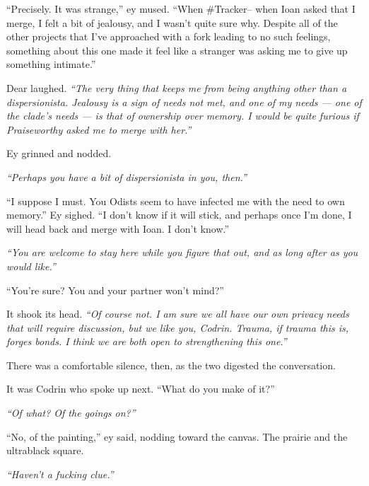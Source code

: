 ``Precisely. It was strange,'' ey mused. ``When \#Tracker-- when Ioan asked that I merge, I felt a bit of jealousy, and I wasn't quite sure why. Despite all of the other projects that I've approached with a fork leading to no such feelings, something about this one made it feel like a stranger was asking me to give up something intimate.''

Dear laughed. \emph{``The very thing that keeps me from being anything other than a dispersionista. Jealousy is a sign of needs not met, and one of my needs — one of the clade's needs — is that of ownership over memory. I would be quite furious if Praiseworthy asked me to merge with her.''}

Ey grinned and nodded.

\emph{``Perhaps you have a bit of dispersionista in you, then.''}

``I suppose I must. You Odists seem to have infected me with the need to own memory.'' Ey sighed. ``I don't know if it will stick, and perhaps once I'm done, I will head back and merge with Ioan. I don't know.''

\emph{``You are welcome to stay here while you figure that out, and as long after as you would like.''}

``You're sure? You and your partner won't mind?''

It shook its head. \emph{``Of course not. I am sure we all have our own privacy needs that will require discussion, but we like you, Codrin. Trauma, if trauma this is, forges bonds. I think we are both open to strengthening this one.''}

There was a comfortable silence, then, as the two digested the conversation.

It was Codrin who spoke up next. ``What do you make of it?''

\emph{``Of what? Of the goings on?''}

``No, of the painting,'' ey said, nodding toward the canvas. The prairie and the ultrablack square.

\emph{``Haven't a fucking clue.''}
